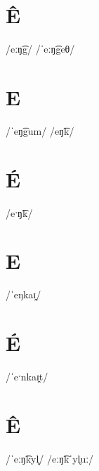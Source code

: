 \documentclass[10pt,a4paper,twoside]{book}
\begin{document}
\section*{Ê}

\begin{multicols}{3}
 {/eːŋ͡g/} {}
 {/ˈeːŋ͡geθ/} {}
\end{multicols}

\section*{E}

\begin{multicols}{3}
 {/ˈeŋ͡gum/} {}
 {/eŋ͡k/} {}
\end{multicols}

\section*{É}

\begin{multicols}{3}
 {/eˑŋ͡k/} {}
\end{multicols}

\section*{E}

\begin{multicols}{3}
 {/ˈeŋkaɪ̯/} {}
\end{multicols}

\section*{É}

\begin{multicols}{3}
 {/ˈeˑnkaɪ̯t/} {}
\end{multicols}

\section*{Ê}

\begin{multicols}{3}
 {/ˈeːŋ͡kyl̥/} {}
 {/eːŋ͡kˈyl̥uː/} {}
\end{multicols}
\end{document}
